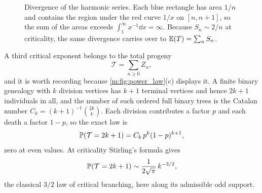 \begin{figure}[H]
    \centering
{}
\caption{Divergence of the harmonic series. Each blue rectangle has area $1/n$ and
contains the region under the red curve $1/x$ on $[n,n+1]$, so the sum of the areas
exceeds $\int_1^\infty x^{-1}\dd x=\infty$. Because $S_n\sim2/n$ at criticality,
the same divergence carries over to $\mathbb{E}\!\left(T\right)=\sum_nS_n$.}
\label{m:fig:harmonic}
\end{figure}

A third critical exponent belongs to the total progeny
\begin{equation*}
\mathcal T = \sum_{n\ge0}Z_n ,
\end{equation*}
and it is worth recording because \cref{m:fig:power_law}(c) displays it. A finite
binary genealogy with $k$ division vertices has $k+1$ terminal vertices and hence
$2k+1$ individuals in all, and the number of such ordered full binary trees is the
Catalan number $C_k = (k+1)^{-1}\binom{2k}{k}$. Each division contributes a factor
$p$ and each death a factor $1-p$, so the exact law is
\begin{equation}
\label{m:eq:totalprogenyexact}
\mathbb{P}\!\left(\mathcal T = 2k+1\right) = C_k\,p^k(1-p)^{k+1},
\end{equation}
zero at even values. At criticality Stirling's formula gives
\begin{equation}
\label{m:eq:totalprogenyasym}
\mathbb{P}\!\left(\mathcal T = 2k+1\right) \sim \frac{1}{2\sqrt{\pi}}\,k^{-3/2},
\end{equation}
the classical $3/2$ law of critical branching, here along its admissible odd
support.

